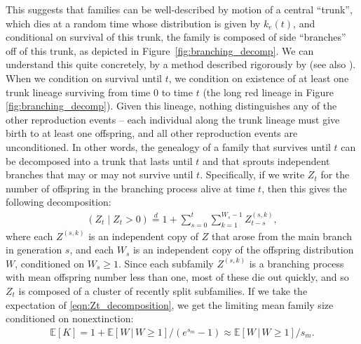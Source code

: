 \documentclass{article}
\newcommand{\citet}[1]{\cite{#1}}
\renewcommand{\P}{\mathbb{P}}
\newcommand{\E}{\mathbb{E}}
\newcommand{\deq}{\stackrel{\scriptscriptstyle{d}}{=}}
\newcommand{\given}{\,\vert\,}
\begin{document}
This suggests that families can be well-described by motion of a central ``trunk'',
which dies at a random time whose distribution is given by $k_e(t)$,
and conditional on survival of this trunk, the family is composed of side ``branches'' off of this trunk,
as depicted in Figure~\ref{fig:branching_decomp}.
We can understand this quite concretely, by a method described rigorously by \citet{geiger1999elementary} (see also \citet{chauvin1991growing}).
When we condition on survival until $t$, we condition on existence of
at least one trunk lineage surviving from time $0$ to time $t$ (the long red
lineage in Figure \ref{fig:branching_decomp}).
Given this lineage, nothing distinguishes any of the other reproduction events --
each individual along the trunk lineage must give birth to at least one offspring,
and all other reproduction events are unconditioned.
In other words, the genealogy of a family that survives until $t$
can be decomposed into a trunk that lasts until $t$
and that sprouts independent branches that may or may not survive until $t$.
Specifically, if we write $Z_t$ for the number of offspring in the branching process alive at time $t$,
then this gives the following decomposition:
\begin{align} \label{eqn:Zt_decomposition}
  \left( Z_t \; \vert \; Z_t>0 \right) \deq 1 + \sum_{s=0}^t \sum_{k=1}^{W_s-1} Z^{(s,k)}_{t-s},
\end{align}
where each $Z^{(s,k)}$ is an independent copy of $Z$ 
that arose from the main branch in generation $s$,
and each $W_s$ is an independent copy of the offspring distribution $W$, conditioned on $W_s \ge 1$.
Since each subfamily $Z^{(s,k)}$ is a branching process with mean offspring number less than one,
most of these die out quickly,
and so $Z_t$ is composed of a cluster of recently split subfamilies.
If we take the expectation of \eqref{eqn:Zt_decomposition},
we get the limiting mean family size conditioned on nonextinction:
\begin{align} \label{eqn:mean_K}
    \E[K] = 1 + \E[W \given W \ge 1] /(e^{s_m}-1) \approx \E[W \given W \ge 1] / s_m .
\end{align}
\end{document}
